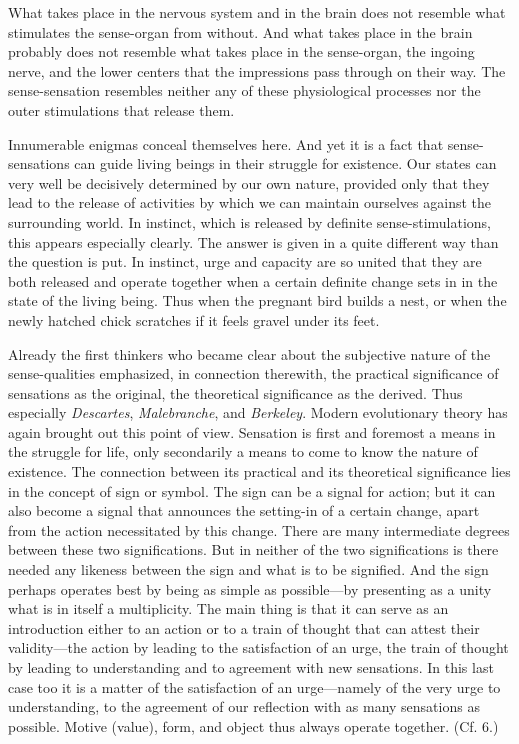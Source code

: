 \documentclass[12pt,a4paper]{book}
\newcommand{\opage}[1]{\marginnote{\footnotesize\textit{[#1]}}}
\begin{document}
What takes place in the nervous system and in the brain does not resemble
what stimulates the sense-organ from without. And what takes place in the
brain probably does not resemble what takes place in the sense-organ, the
ingoing nerve, and the lower centers that the impressions pass through on
their way. The sense-sensation resembles neither any of these
physiological processes nor the outer stimulations that release them.

Innumerable enigmas conceal themselves here. And yet it is a fact that
sense-sensations can guide living beings in their struggle for existence.
Our states can very well be decisively determined by our own nature,
provided only that they lead to the release of activities by which we can
maintain ourselves against the surrounding world. In instinct, which is
released by definite sense-stimulations, this appears especially clearly.
The answer is given in a quite different way than the question is put. In
instinct, urge and capacity are so united that they are both released and
operate together when a certain definite change sets in in the state of
the living being. Thus when the pregnant bird builds a nest, or when the
newly hatched chick scratches if it feels gravel under its feet.

Already the first thinkers who became clear about the subjective nature
of the sense-qualities emphasized, in connection therewith, the practical
significance of sensations as the original, the theoretical significance
as the derived. Thus especially \emph{Descartes}, \emph{Malebranche},
and \emph{Berkeley}. Modern evolutionary theory has again brought out
this point of view. Sensation is first and foremost a means in the
struggle for life, only secondarily a means to come to know the nature of
existence. The connection between its practical and its \opage{43}theoretical
significance lies in the concept of sign or symbol. The sign can be a
signal for action; but it can also become a signal that announces the
setting-in of a certain change, apart from the action necessitated by
this change. There are many intermediate degrees between these two
significations. But in neither of the two significations is there needed
any likeness between the sign and what is to be signified. And the sign
perhaps operates best by being as simple as possible---by presenting as a
unity what is in itself a multiplicity. The main thing is that it can
serve as an introduction either to an action or to a train of thought
that can attest their validity---the action by leading to the
satisfaction of an urge, the train of thought by leading to understanding
and to agreement with new sensations. In this last case too it is a
matter of the satisfaction of an urge---namely of the very urge to
understanding, to the agreement of our reflection with as many sensations
as possible. Motive (value), form, and object thus always operate
together. (Cf. 6.)
\end{document}
